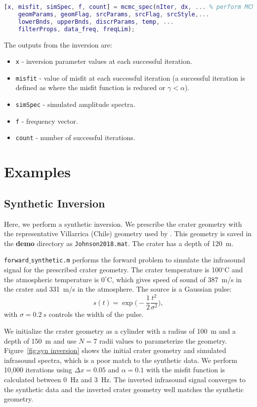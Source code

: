 \documentclass[10pt]{article}
\begin{document}
\begin{lstlisting}[language=Matlab]
[x, misfit, simSpec, f, count] = mcmc_spec(nIter, dx, ... % perform MCMC inversion
    geomParams, geomFlag, srcParams, srcFlag, srcStyle,...
    lowerBnds, upperBnds, discrParams, temp, ...
    filterProps, data_freq, freqLim);
\end{lstlisting}

The outputs from the inversion are:
\begin{itemize}
\item \texttt{x} - inversion parameter values at each successful iteration. 
\item \texttt{misfit} - value of misfit at each successful iteration (a successful iteration is defined as where the misfit function is reduced or $\gamma < \alpha$).
\item \texttt{simSpec} - simulated amplitude spectra.
\item \texttt{f} - frequency vector.
\item \texttt{count} - number of successful iterations.
\end{itemize}


\section{Examples}
\subsection{Synthetic Inversion}
Here, we perform a synthetic inversion. We prescribe the crater geometry with the representative Villarrica (Chile) geometry used by \cite{Johnson2018_Villarrica}. This geometry is saved in the {\bf demo} directory as  \texttt{Johnson2018.mat}. The crater has a depth of 120~m.

\texttt{forward$\_$synthetic.m} performs the forward problem to simulate the infrasound signal for the prescribed crater geometry. The crater temperature is 100$^\circ$C and the atmospheric temperature is $0^\circ$C, which gives speed of sound of 387~m/s in the crater and 331~m/s in the atmosphere. The source is a Gaussian pulse:
\begin{equation}
s(t) = \exp \bigg( -\frac{1}{2} \frac{t^2}{\sigma^2} \bigg),
\end{equation}
with $\sigma=0.2~s$ controls the width of the pulse. 

We initialize the crater geometry as a cylinder with a radius of 100~m and a depth of 150~m and use $N=7$ radii values to parameterize the geometry. Figure~\ref{fig:syn inversion} shows the initial crater geometry and simulated infrasound spectra, which is a poor match to the synthetic data. We perform 10,000 iterations using $\Delta x=0.05$ and $\alpha=0.1$ with the misfit function is calculated between 0~Hz and 3~Hz. The inverted infrasound signal converges to the synthetic data and the inverted crater geometry well matches the synthetic geometry.
\end{document}
